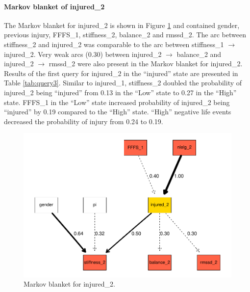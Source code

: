 \documentclass[man,floatsintext]{apa6}
\let\oldparagraph\paragraph
\renewcommand{\paragraph}[1]{\oldparagraph{#1}\mbox{}}
\begin{document}
\hypertarget{markov-blanket-of-injured_2}{%
\paragraph{Markov blanket of injured\_2}\label{markov-blanket-of-injured_2}}

The Markov blanket for injured\_2 is shown in Figure \ref{fig:mb2} and contained gender, previous injury, FFFS\_1, stiffness\_2, balance\_2 and rmssd\_2.
The arc between stiffness\_2 and injured\_2 was comparable to the arc between stiffness\_1 \(\rightarrow\) injured\_2.
Very weak arcs (0.30) between injured\_2 \(\rightarrow\) balance\_2 and injured\_2 \(\rightarrow\) rmssd\_2 were also present in the Markov blanket for injured\_2.
Results of the first query for injured\_2 in the \enquote{injured} state are presented in Table \ref{tab:query3}.
Similar to injured\_1, stiffness\_2 doubled the probability of injured\_2 being \enquote{injured} from 0.13 in the \enquote{Low} state to 0.27 in the \enquote{High} state.
FFFS\_1 in the \enquote{Low} state increased probability of injured\_2 being \enquote{injured} by 0.19 compared to the \enquote{High} state.
\enquote{High} negative life events decreased the probability of injury from 0.24 to 0.19.

\begin{figure}[H]
\centering
\includegraphics{figs/study1figs/mb2-1.pdf}
\caption{\label{fig:mb2}Markov blanket for injured\_2.}
\end{figure}
\end{document}
